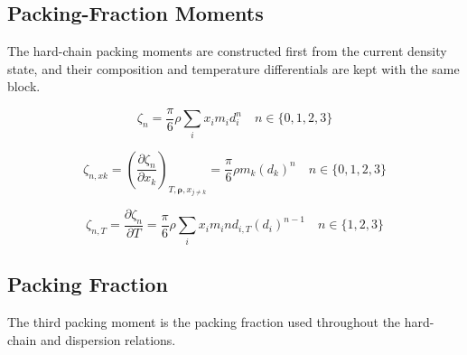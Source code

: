 \documentclass[12pt, letterpaper]{article}
\begin{document}
\subsection{Packing-Fraction Moments}

The hard-chain packing moments are constructed first from the current density state, and their composition and temperature differentials are kept with the same block.

\begin{equation}
    \zeta_{n}=\frac{\pi}{6} \rho \sum_{i} x_{i} m_{i} d_{i}^n \quad n \in\{0,1,2,3\}
    \label{eq:zeta_n}
\end{equation}


\begin{equation}
    \zeta_{n,xk}=\left(\frac{\partial\zeta_{n}}{\partial x_{k}}\right)_{T,\boldsymbol{\rho},x_{j\neq k}}=\frac{\pi}{6}\rho m_{k}(d_{k})^{n}\quad n\in\{0,1,2,3\}
    \label{eq:zeta_n_xk}
\end{equation}


\begin{equation}
    \zeta_{n,T}=\frac{\partial\zeta_{n}}{\partial T}=\frac{\pi}{6}\rho\sum_{i}x_{i}m_{i}nd_{i,T}\left(d_{i}\right)^{n-1}\quad n\in\{1,2,3\}
    \label{eq:zeta_n_dT}
\end{equation}

\subsection{Packing Fraction}

The third packing moment is the packing fraction used throughout the hard-chain and dispersion relations.
\end{document}
